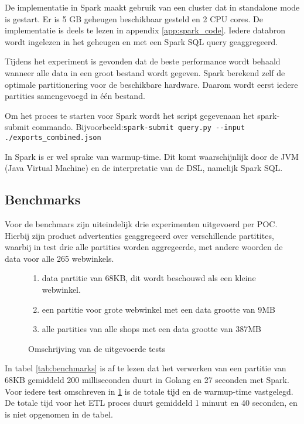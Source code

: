 De implementatie in Spark maakt gebruik van een cluster dat in standalone mode is gestart. Er is 5 GB geheugen beschikbaar gesteld en 2 CPU cores. De implementatie is deels te lezen in appendix \ref{app:spark_code}. Iedere databron wordt ingelezen in het geheugen en met een Spark SQL query geaggregeerd.

Tijdens het experiment is gevonden dat de beste performance wordt behaald wanneer alle data in een groot bestand wordt gegeven. Spark berekend zelf de optimale partitionering voor de beschikbare hardware. Daarom wordt eerst iedere partities samengevoegd in één bestand.

Om het proces te starten voor Spark wordt het script gegevenaan het spark-submit commando. Bijvoorbeeld:\newline\verb+spark-submit query.py --input ./exports_combined.json+

In Spark is er wel sprake van warmup-time. Dit komt waarschijnlijk door de JVM (Java Virtual Machine) en de interpretatie van de DSL, namelijk Spark SQL.

\subsection{Benchmarks}
\label{sec:benchmarks}

Voor de benchmars zijn uiteindelijk drie experimenten uitgevoerd per POC. Hierbij zijn product advertenties geaggregeerd over verschillende partitites, waarbij in test drie alle partities worden aggregeerde, met andere woorden de data voor alle 265 webwinkels.

\begin{figure}[h]
\caption{Omschrijving van de uitgevoerde tests}
\label{fig:test}
\begin{enumerate}
    \item data partitie van 68KB, dit wordt beschouwd als een kleine webwinkel.
    \item een partitie voor grote webwinkel met een data grootte van 9MB
    \item alle partities van alle shops met een data grootte van 387MB
\end{enumerate}
\end{figure}

In tabel \ref{tab:benchmarks} is af te lezen dat het verwerken van een partitie van 68KB gemiddeld 200 milliseconden duurt in Golang en 27 seconden met Spark. Voor iedere test omschreven in \ref{fig:test} is de totale tijd en de warmup-time vastgelegd. De totale tijd voor het ETL proces duurt gemiddeld 1 minuut en 40 seconden, en is niet opgenomen in de tabel.

